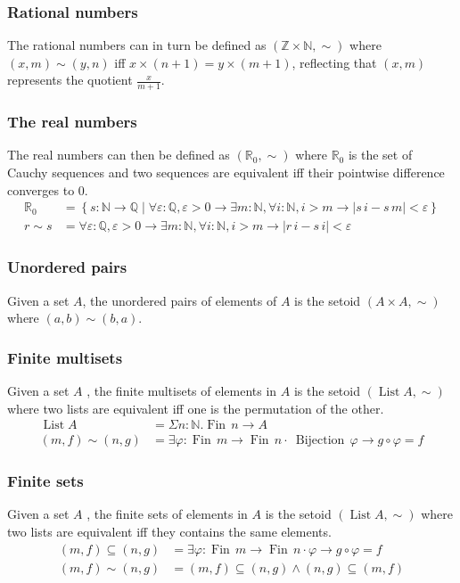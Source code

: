 \documentclass[envcountsame]{llncs}
\newcommand{\N}{\mathbb{N}}
\newcommand{\Q}{\mathbb{Q}}
\newcommand{\R}{\mathbb{R}}
\newcommand{\Z}{\mathbb{Z}}
\providecommand{\set}  [1]{\left\{#1\right\}}
\DeclareMathOperator{\List}{List}
\DeclareMathOperator{\Fin}{Fin}
\begin{document}
\subsubsection*{Rational numbers}
The rational numbers can in turn be defined as $(\Z\times\N,\sim)$ where $(x,m)\sim(y,n)$ if{f} $x\times(n+1)=y\times(m+1)$, reflecting that $(x,m)$ represents the quotient $\frac {x}{m+1}$.


\subsubsection*{The real numbers}

The real numbers can then be defined as $(\R_0,\sim)$ where $\R_0$ is the set of Cauchy sequences and two sequences are equivalent if{f} their pointwise difference converges to $0$. 
\begin{align*}
\R_0&=\set{s : \N\to\Q \mid \forall\varepsilon :\Q,\varepsilon>0\to\exists m:\N, \forall i:\N, i>m\to |s\,i - s\, m|<\varepsilon}\\
r\sim s &= \forall\varepsilon :\Q,\varepsilon>0\to\exists m:\N, \forall i:\N, i>m\to |r\,i - s\,i|<\varepsilon
\end{align*}

\subsubsection*{Unordered pairs}
Given a set $A$, the unordered pairs of elements of $A$ is the setoid $(A\times A,\sim)$ where
$(a,b)\sim(b,a)$.

\subsubsection*{Finite multisets}
Given a set $A$ , the finite multisets of elements in $A$ is the setoid $(\List A,\sim)$ where two lists are equivalent if{f} one is the permutation of the other.
\begin{align*}
\List A &= \Sigma n:\N.\Fin\,n\to A\\
(m,f)\sim(n,g) &= \exists \varphi : \Fin\,m \to \Fin\,n \cdot\ \mathop{Bijection}\,\varphi \to g\circ\varphi = f  
\end{align*}

\subsubsection*{Finite sets}
Given a set $A$ , the finite sets of elements in $A$ is the setoid $(\List A,\sim)$ where two lists are equivalent if{f} they contains the same elements.
\begin{align*}
(m,f)\subseteq(n,g) &= \exists \varphi : \Fin\,m \to \Fin\,n \cdot \varphi \to g\circ\varphi = f  \\
(m,f)\sim(n,g)&= (m,f)\subseteq(n,g) \wedge (n,g)\subseteq(m,f)
\end{align*}
\end{document}
